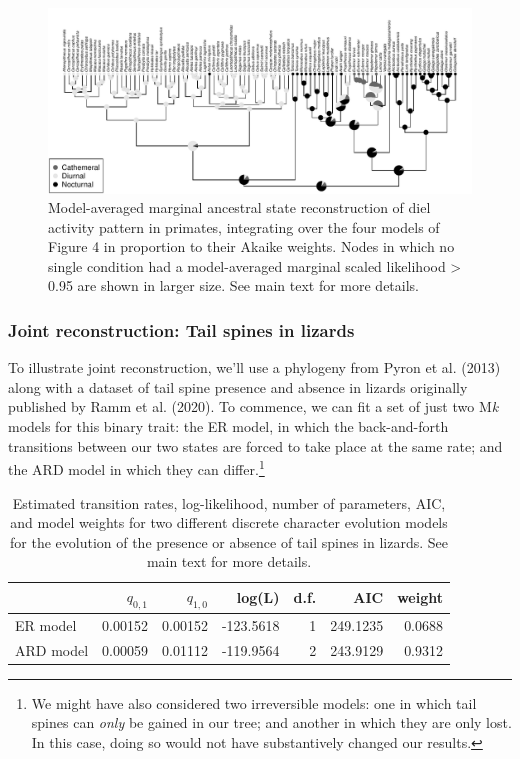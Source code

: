 \documentclass{article}
\begin{document}
\begin{figure}
\includegraphics[width=1\linewidth]{Revell.AncestralReconstruction_files/figure-latex/fig5-1} \caption{Model-averaged marginal ancestral state reconstruction of diel activity pattern in primates, integrating over the four models of Figure 4 in proportion to their Akaike weights. Nodes in which no single condition had a model-averaged marginal scaled likelihood > 0.95 are shown in larger size. See main text for more details.}\label{fig:fig5}
\end{figure}

\subsubsection{Joint reconstruction: Tail spines in lizards}\label{joint-reconstruction-tail-spines-in-lizards}

To illustrate joint reconstruction, we'll use a phylogeny from Pyron et al. (2013) along with a dataset of tail spine presence and absence in lizards originally published by Ramm et al. (2020). To commence, we can fit a set of just two M\emph{k} models for this binary trait: the ER model, in which the back-and-forth transitions between our two states are forced to take place at the same rate; and the ARD model in which they can differ.\footnote{We might have also considered two irreversible models: one in which tail spines can \emph{only} be gained in our tree; and another in which they are only lost. In this case, doing so would not have substantively changed our results.}

\begin{table}

\caption{\label{tab:unnamed-chunk-22}Estimated transition rates, log-likelihood, number of parameters, AIC, and model weights for two different discrete character evolution models for the evolution of the presence or absence of tail spines in lizards. See main text for more details.}
\centering
\begin{tabular}[t]{l|r|r|r|r|r|r}
\hline
  & $q_{0,1}$ & $q_{1,0}$ & log(L) & d.f. & AIC & weight\\
\hline
ER model & 0.00152 & 0.00152 & -123.5618 & 1 & 249.1235 & 0.0688\\
\hline
ARD model & 0.00059 & 0.01112 & -119.9564 & 2 & 243.9129 & 0.9312\\
\hline
\end{tabular}
\end{table}
\end{document}
